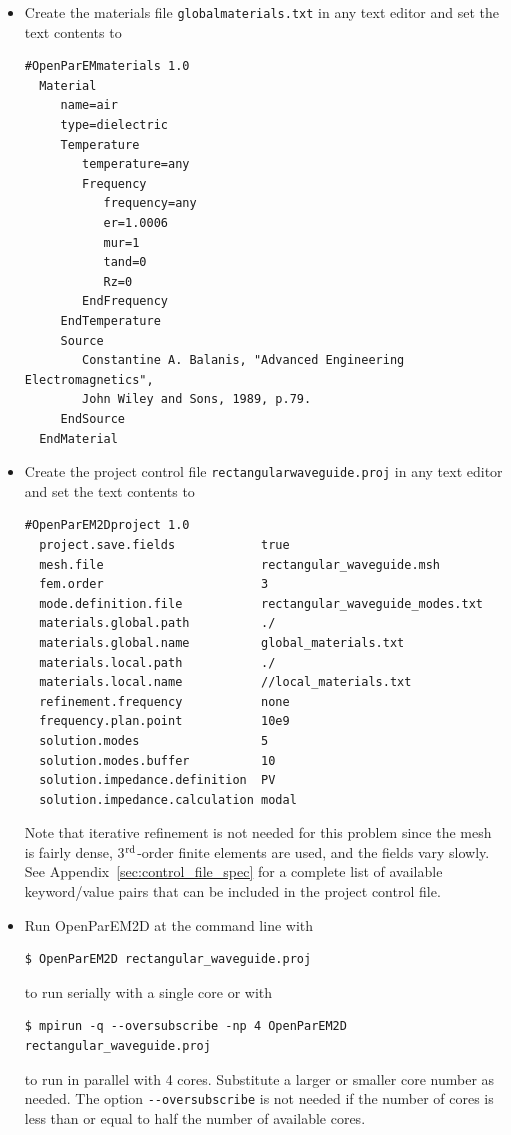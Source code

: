 \documentclass[titlepage]{article}
\renewcommand\_{\textunderscore\linebreak[1]}
\begin{document}
\begin{itemize}

\item Create the materials file \texttt{global\_materials.txt} in any text editor and set the text contents to
\begin{Verbatim}[fontsize=\small]
  #OpenParEMmaterials 1.0
  Material
     name=air
     type=dielectric
     Temperature
        temperature=any
        Frequency
           frequency=any
           er=1.0006
           mur=1
           tand=0
           Rz=0
        EndFrequency
     EndTemperature
     Source
        Constantine A. Balanis, "Advanced Engineering Electromagnetics",
        John Wiley and Sons, 1989, p.79.
     EndSource
  EndMaterial
\end{Verbatim}
\item Create the project control file \texttt{rectangular\_waveguide.proj} in any text editor and set the text contents to
\begin{Verbatim}[fontsize=\small]
  #OpenParEM2Dproject 1.0
  project.save.fields            true
  mesh.file                      rectangular_waveguide.msh
  fem.order                      3
  mode.definition.file           rectangular_waveguide_modes.txt
  materials.global.path          ./
  materials.global.name          global_materials.txt
  materials.local.path           ./
  materials.local.name           //local_materials.txt
  refinement.frequency           none
  frequency.plan.point           10e9
  solution.modes                 5
  solution.modes.buffer          10
  solution.impedance.definition  PV
  solution.impedance.calculation modal
\end{Verbatim}

\noindent Note that iterative refinement is not needed for this problem since the mesh is fairly dense, 3$^{\textnormal{rd}}$-order finite elements are used, and the fields vary slowly.  See Appendix~\ref{sec:control_file_spec} for a complete list of available keyword/value pairs that can be included in the project control file.

\item Run OpenParEM2D at the command line with
\begin{Verbatim}[fontsize=\small]
   $ OpenParEM2D rectangular_waveguide.proj
\end{Verbatim}
to run serially with a single core or with
\begin{Verbatim}[fontsize=\small]
   $ mpirun -q --oversubscribe -np 4 OpenParEM2D rectangular_waveguide.proj
\end{Verbatim}
to run in parallel with 4 cores.  Substitute a larger or smaller core number as needed.  The option \verb+--oversubscribe+ is not needed if the number of cores is less than or equal to half the number of available cores.
\end{itemize}
\end{document}
